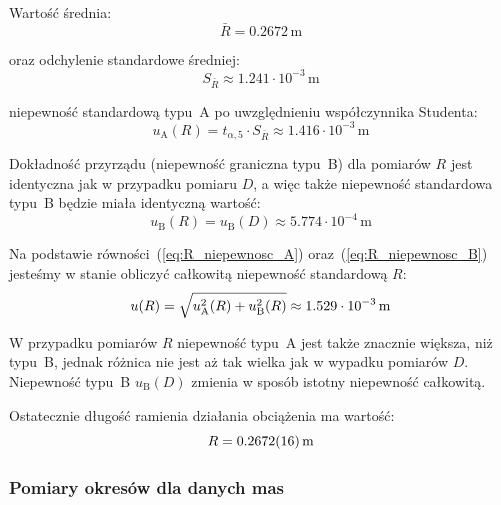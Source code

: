 \documentclass[twocolumn, a4paper, polish, 10pt]{article}
\begin{document}


Wartość średnia:
\begin{displaymath}
    \bar{R} = 0.2672 \, \mathrm{m}
\end{displaymath}

oraz odchylenie standardowe średniej:
\begin{displaymath}
    S_{\bar{R}} \approx 1.241 \cdot 10^{-3} \, \mathrm{m}
\end{displaymath}

niepewność standardową typu~A po uwzględnieniu współczynnika Studenta:
\begin{equation}
    u_{\mathrm{A}}(R) = t_{\alpha, 5} \cdot S_{\bar{R}} \approx 1.416 \cdot 10^{-3} \, \mathrm{m}
\label{eq:R_niepewnosc_A}
\end{equation}

Dokładność przyrządu (niepewność graniczna typu~B) dla pomiarów $R$ jest identyczna jak w przypadku pomiaru $D$, a więc także niepewność standardowa typu~B będzie miała identyczną wartość:
\begin{equation}
    u_{\mathrm{B}}(R) = u_{\mathrm{B}}(D) \approx 5.774 \cdot 10^{-4} \, \mathrm{m}
\label{eq:R_niepewnosc_B}
\end{equation}

Na podstawie równości~(\ref{eq:R_niepewnosc_A}) oraz~(\ref{eq:R_niepewnosc_B}) jesteśmy w stanie obliczyć całkowitą niepewność standardową $R$:
\begin{displaymath}
    u(R) = \sqrt{ u_{\mathrm{A}}^2(R) + u_{\mathrm{B}}^2(R) } \approx 1.529 \cdot 10^{-3} \, \mathrm{m} \\
\end{displaymath}

W przypadku pomiarów $R$ niepewność typu~A jest także znacznie większa, niż typu~B, jednak różnica nie jest aż tak wielka jak w wypadku pomiarów $D$. Niepewność typu~B $u_{\mathrm{B}}(D)$ zmienia w sposób istotny niepewność całkowitą.

Ostatecznie długość ramienia działania obciążenia ma wartość:
\begin{displaymath}
    R = 0.2672(16) \, \mathrm{m} \\
\end{displaymath}

\subsubsection{Pomiary okresów dla danych mas}
\end{document}
